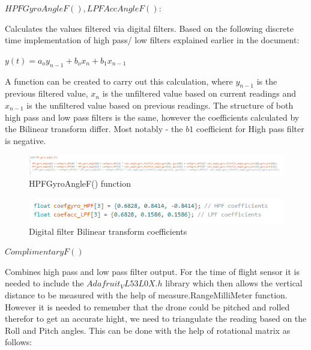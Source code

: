 $HPFGyroAngleF(), LPFAccAngleF():$\newline

Calculates the values filtered via digital filters. Based on the following discrete time implementation of high pass/ low filters explained earlier in the document:

$y(t)=a_o y_{n-1}+b_ox_n+b_1x_{n-1}  $


A function can be created to carry out this calculation, where $y_{n-1}$ is the previous filtered value, $x_n$ is the unfiltered value based on current readings and $x_{n-1}$ is the unfiltered value based on previous readings. The structure of both high pass and low pass filters is the same, however the coefficients calculated by the Bilinear transform differ. Most notably - the 
$b1$ coefficient for High pass filter is negative.

\begin{figure}[H]
    \begin{center}
    \includegraphics[scale = 0.85]{pictures/IMU/HPF_gyro.png}
    \end{center}
    \caption{HPFGyroAngleF() function}
    \label{fig:my_label}
\end{figure}

\begin{figure}[H]
    \begin{center}
    \includegraphics[scale = 0.85]{pictures/IMU/HPF_LPF_coefff.png}
    \end{center}
    \caption{Digital filter Bilinear transform coefficients}
    \label{fig:my_label}
\end{figure}


$ComplimentaryF()$
\newline

Combines high pass and low pass filter output.
For the time of flight sensor it is needed to include the $Adafruit_VL53L0X.h$ library which then allows the vertical distance to be measured with the help of measure.RangeMilliMeter function.
However it is needed to remember that the drone could be pitched and rolled therefor to get an accurate hight, we need to triangulate the reading based on the Roll and Pitch angles.
This can be done with the help of rotational matrix as follows:


